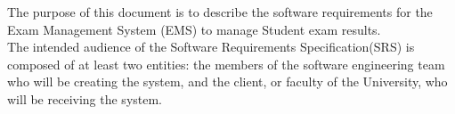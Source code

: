 The purpose of this document is to describe the software requirements for the Exam Management System (EMS) to manage Student exam results.
\\
The intended audience of the Software Requirements Specification(SRS) is composed of at least two entities: the members of the software engineering team who will be creating the system, and the client, or faculty of the University, who will be receiving the system.